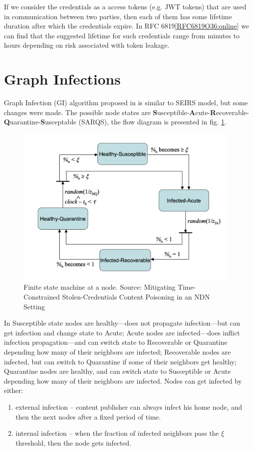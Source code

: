 \documentclass[nostrict]{szablonPG}
\begin{document}
If we consider the credentials as a access tokens (e.g. JWT tokens) that are used in communication between two parties, then each of them has some lifetime duration after which the credentials expire. In RFC 6819\ref{RFC6819O36:online} we can find that the suggested lifetime for such credentials range from minutes to hours depending on risk associated with token leakage.

\section{Graph Infections}
Graph Infection (GI) algorithm proposed in \cite{konorski2019mitigating} is similar to SEIRS model, but some changes were made. The possible node states are \textbf{S}usceptible-\textbf{A}cute-\textbf{R}ecoverable-\textbf{Q}uarantine-\textbf{S}usceptable (SARQS), the flow diagram is presented in fig. \ref{fig:finite-state-machine-jekon}.
\begin{figure}[h!]
    \includegraphics[width=11cm]{img/finite-state-at-node.png}
    \centering
    \caption{Finite state machine at a node. Source: Mitigating Time-Constrained Stolen-Credentials Content Poisoning in an NDN Setting \cite{konorski2019mitigating}}
    \label{fig:finite-state-machine-jekon}
\end{figure} 
In Susceptible state nodes are healthy––does not propagate infection––but can get infection and change state to Acute; Acute nodes are infected––does inflict infection propagation––and can switch state to Recoverable or Quarantine depending how many of their neighbors are infected; Recoverable nodes are infected, but can switch to Quarantine if some of their neighbors get healthy; Quarantine nodes are healthy, and can switch state to Susceptible or Acute depending how many of their neighbors are infected. 
Nodes can get infected by either:
\begin{enumerate}
    \item external infection -- content publisher can always infect his home node, and then the next nodes after a fixed period of time.
    \item internal infection -- when the fraction of infected neighbors pass the $\xi$ threshold, then the node gets infected. 
\end{enumerate}
\end{document}
